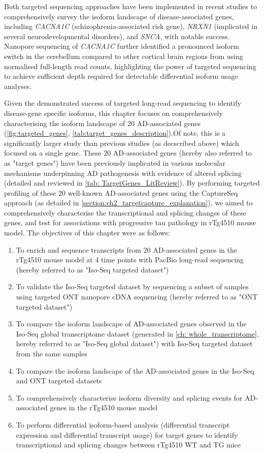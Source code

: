 Both targeted sequencing approaches have been implemented in recent studies\cite{Clark2019,Treutlein2014,Tseng2019} to comprehensively survey the isoform landscape of disease-associated genes, including \textit{CACNA1C} (schizophrenia-associated risk gene)\cite{Clark2019}, \textit{NRXN1} (implicated in several neurodevelopmental disorders)\cite{Treutlein2014}, and \textit{SNCA}\cite{Tseng2019}, with notable success. Nanopore sequencing of \textit{CACNA1C} further identified a pronounced isoform switch in the cerebellum compared to other cortical brain regions from using normalised full-length read counts\cite{Clark2019}, highlighting the power of targeted sequencing to achieve sufficient depth required for detectable differential isoform usage analyses. 

Given the demonstrated success of targeted long-read sequencing to identify disease-gene specific isoforms, this chapter focuses on comprehensively characterising the isoform landscape of 20 AD-associated genes (\cref{fig:targeted_genes}, \cref{tab:target_genes_description}).Of note, this is a significantly larger study than previous studies (as decscribed above) which focused on a single gene. These 20 AD-associated genes (hereby also referred to as "target genes") have been previously implicated in various molecular mechanisms underpinning AD pathogenesis with evidence of altered splicing (detailed and reviewed in \cref{tab: TargetGenes_LitReview}). By performing targeted profiling of these 20 well-known AD-associated genes using the CaptureSeq approach (as detailed in \cref{section:ch2_targetcapture_explanation}), we aimed to comprehensively characterise the transcriptional and splicing changes of these genes, and test for associations with progressive tau pathology in rTg4510 mouse model. The objectives of this chapter were as follows:
\begin{enumerate}
	\item To enrich and sequence transcripts from 20 AD-associated genes in the rTg4510 mouse model at 4 time points with PacBio long-read sequencing (hereby referred to as "Iso-Seq targeted dataset")
	\item To validate the Iso-Seq targeted dataset by sequencing a subset of samples using targeted ONT nanopore cDNA sequencing (hereby referred to as "ONT targeted dataset")
	\item To compare the isoform landscape of AD-associated genes observed in the Iso-Seq global transcriptome dataset (generated in \cref{ch: whole_transcriptome}, hereby referred to as "Iso-Seq global dataset") with Iso-Seq targeted dataset from the same samples 
	\item To compare the isoform landscape of the AD-associated genes in the Iso-Seq and ONT targeted datasets
	\item To comprehensively characterise isoform diversity and splicing events for AD-associated genes in the rTg4510 mouse model 
	\item To perform differential isoform-based analysis (differential transcript expression and differential transcript usage) for target genes to identify transcriptional and splicing changes between rTg4510 WT and TG mice
\end{enumerate} 
 

